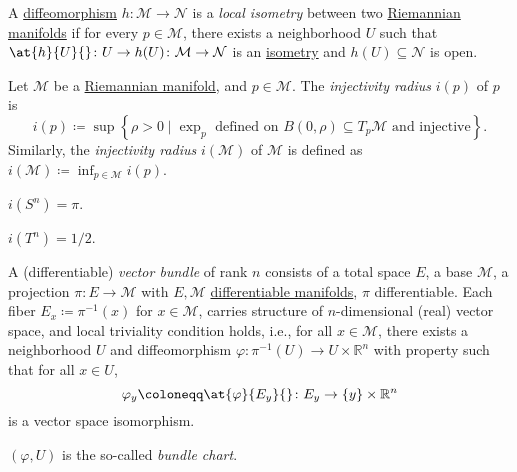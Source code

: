 \begin{definition}\label{def:local-isometry}
	A \hyperref[def:diffeomorphism]{diffeomorphism} \(h\colon \mathcal{M} \to \mathcal{N} \) is a \emph{local isometry} between two \hyperref[def:Riemannian-manifold]{Riemannian manifolds} if for every \(p\in \mathcal{M} \), there exists a neighborhood \(U\) such that \(\at{h}{U}{} \colon U \to  h(U)\colon \mathcal{M} \to \mathcal{N} \) is an \hyperref[def:isometry]{isometry} and \(h(U) \subseteq \mathcal{N} \) is open.
\end{definition}

\begin{definition}\label{def:injectivity-radius}
	Let \(\mathcal{M} \) be a \hyperref[def:Riemannian-manifold]{Riemannian manifold}, and \(p\in \mathcal{M} \). The \emph{injectivity radius} \(i(p)\) of \(p\) is
	\[
		i(p) \coloneqq \sup \left\{ \rho > 0 \mid \exp _p \text{ defined on \(B(0, \rho ) \subseteq T_p \mathcal{M} \) and injective}  \right\}.
	\]
	Similarly, the \emph{injectivity radius} \(i(\mathcal{M} )\) of \(\mathcal{M} \) is defined as \(i(\mathcal{M} )\coloneqq \inf _{p\in \mathcal{M} }i(p)\).
\end{definition}

\begin{eg}[Sphere]
	\(i(S^n) = \pi \).
\end{eg}

\begin{eg}[Torus]
	\(i(T^n) = 1 / 2\).
\end{eg}

\begin{definition}\label{def:vector-bundle}
	A (differentiable) \emph{vector bundle} of rank \(n\) consists of a total space \(E\), a base \(\mathcal{M} \), a projection \(\pi \colon E\to \mathcal{M} \) with \(E, \mathcal{M} \) \hyperref[def:smooth-manifold]{differentiable manifolds}, \(\pi \) differentiable. Each fiber \(E_x\coloneqq \pi ^{-1} (x)\) for \(x\in \mathcal{M} \), carries structure of \(n\)-dimensional (real) vector space, and local triviality condition holds, i.e., for all \(x\in \mathcal{M} \), there exists a neighborhood \(U\) and diffeomorphism \(\varphi \colon \pi ^{-1} (U) \to U\times \mathbb{R} ^n\) with property such that for all \(x\in U\),
	\[
		\varphi _y \coloneqq \at{\varphi }{E_y}{} \colon E_y \to \left\{ y \right\} \times \mathbb{R} ^n
	\]
	is a vector space isomorphism.

	\begin{definition}\label{def:bundle-chart}
		\((\varphi , U)\) is the so-called \emph{bundle chart}.
	\end{definition}
\end{definition}


